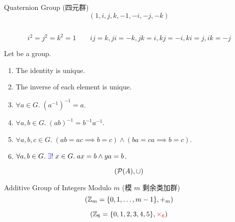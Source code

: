 \begin{frame}
  \begin{exampleblock}{Quaternion Group (四元群)}
    \[
      (1, i, j, k, -1, -i, -j, -k)
    \]
    \begin{columns}
        \begin{center}
        \end{center}
    \end{columns}
    \[
      i^2 = j^2 = k^2 = 1 \qquad ij = k, ji = -k, jk = i, kj = -i, ki = j, ik = -j
    \]
  \end{exampleblock}
\end{frame}

\begin{frame}
  \begin{theorem}
    Let  be a group.
    \begin{enumerate}[<+->][(1)]
      \setlength{\itemsep}{8pt}
      \item The identity is unique.
      \item The inverse of each element is unique.
      \item $\forall a \in G.\; (a^{-1})^{-1} = a$.
      \item $\forall a, b \in G.\; (ab)^{-1} = b^{-1}a^{-1}$.
      \item $\forall a, b, c \in G.\; (ab = ac \implies b = c) \land (ba = ca \implies b = c)$.
      \item $\forall a, b \in G.\; \textcolor{blue}{\exists!}\; x \in G.\; ax = b \land ya = b$.
    \end{enumerate}
  \end{theorem}
\end{frame}

\begin{frame}
  \[
    (\mathcal{P}(A), \cup)
  \]
\end{frame}

\begin{frame}
  \begin{exampleblock}{Additive Group of Integers Modulo $m$ (模 $m$ 剩余类加群)}
    \[
      (\mathbb{Z}_{m} = \{0, 1, \dots, m-1\}, +_{m})
    \]
  \end{exampleblock}

  \pause
  \vspace{0.30cm}
  \[
    (\mathbb{Z}_{6} = \{0, 1, 2, 3, 4, 5\}, \textcolor{red}{\times_{6}})
  \]
\end{frame}

